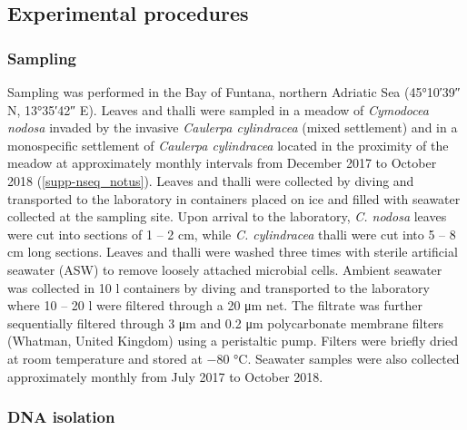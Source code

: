 \documentclass[12pt,]{article}
\begin{document}
\newpage

\hypertarget{experimental-procedures}{%
\subsection{Experimental procedures}\label{experimental-procedures}}

\hypertarget{sampling}{%
\subsubsection{Sampling}\label{sampling}}

Sampling was performed in the Bay of Funtana, northern Adriatic Sea
(\ang{45;10;39} N, \ang{13;35;42} E). Leaves and thalli were sampled in
a meadow of \emph{Cymodocea nodosa} invaded by the invasive
\emph{Caulerpa cylindracea} (mixed settlement) and in a monospecific
settlement of \emph{Caulerpa cylindracea} located in the proximity of
the meadow at approximately monthly intervals from December 2017 to
October 2018 (\autoref{supp-nseq_notus}). Leaves and thalli were
collected by diving and transported to the laboratory in containers
placed on ice and filled with seawater collected at the sampling site.
Upon arrival to the laboratory, \emph{C. nodosa} leaves were cut into
sections of 1 -- 2 \si{\cm}, while \emph{C. cylindracea} thalli were cut
into 5 -- 8 \si{\cm} long sections. Leaves and thalli were washed three
times with sterile artificial seawater (ASW) to remove loosely attached
microbial cells. Ambient seawater was collected in 10 \si{\l} containers
by diving and transported to the laboratory where 10 -- 20 \si{\l} were
filtered through a 20 \si{\um} net. The filtrate was further
sequentially filtered through 3 \si{\um} and 0.2 \si{\um} polycarbonate
membrane filters (Whatman, United Kingdom) using a peristaltic pump.
Filters were briefly dried at room temperature and stored at \num{-80}
\si{\degreeCelsius}. Seawater samples were also collected approximately
monthly from July 2017 to October 2018.

\hypertarget{dna-isolation}{%
\subsubsection{DNA isolation}\label{dna-isolation}}
\end{document}

